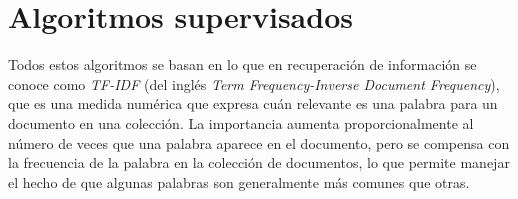\section{Algoritmos supervisados}

Todos estos algoritmos se basan en lo que en recuperación de información se conoce como \textit{TF-IDF} (del inglés \textit{Term Frequency-Inverse Document Frequency}), 
que es una medida numérica que expresa cuán relevante es una palabra para un documento en una colección. 
La importancia aumenta proporcionalmente al número de veces que una palabra aparece en el documento, pero se compensa con la frecuencia 
de la palabra en la colección de documentos, lo que permite manejar el hecho de que algunas palabras son generalmente 
más comunes que otras.